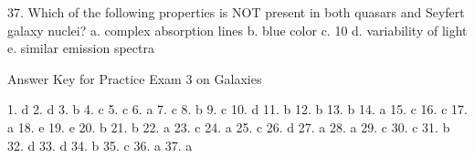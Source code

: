  37. Which of the following properties is NOT present in both quasars and Seyfert galaxy nuclei?
      a.  complex absorption lines
      b.  blue color
      c.  10 %
      d.  variability of light
      e.  similar emission spectra
      
 
 
 
 
 
 
 
 
 
 
Answer Key   for Practice Exam 3 on Galaxies
 
   1. d        
   2. d        
   3. b        
   4. c        
   5. c        
   6. a        
   7. c        
   8. b        
   9. c        
  10. d        
  11. b        
  12. b        
  13. b
  14. a      
  15. c       
  16. c        
  17. a        
  18. e        
  19. e        
  20. b        
  21. b        
  22. a        
  23. c        
  24. a        
  25. c        
  26. d       
  27. a        
  28. a        
  29. c        
  30. c        
  31. b        
  32. d       
  33. d        
  34. b       
  35. c        
  36. a    
  37. a
 
